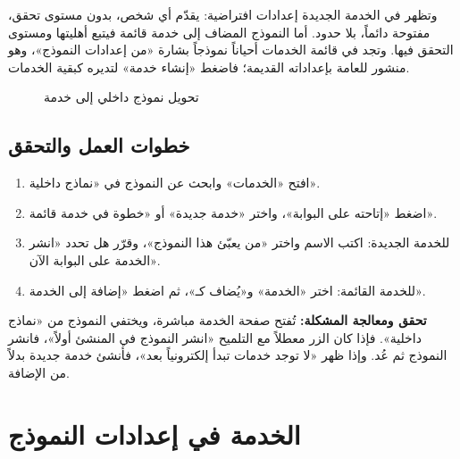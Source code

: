 وتظهر في الخدمة الجديدة إعدادات افتراضية: يقدّم أي شخص، بدون مستوى تحقق، مفتوحة دائماً، بلا حدود. أما النموذج المضاف إلى خدمة قائمة فيتبع أهليتها ومستوى التحقق فيها. وتجد في قائمة الخدمات أحياناً نموذجاً بشارة «من إعدادات النموذج»، وهو منشور للعامة بإعداداته القديمة؛ فاضغط «إنشاء خدمة» لتديره كبقية الخدمات.

\begin{figure}[H]
\centering
{}
\rclegend
\caption{تحويل نموذج داخلي إلى خدمة}
\label{fig:builder-services-publish-flow}
\end{figure}

\subsection{خطوات العمل والتحقق}
\begin{enumerate}
\item افتح «الخدمات» وابحث عن النموذج في «نماذج داخلية».
\item اضغط «إتاحته على البوابة»، واختر «خدمة جديدة» أو «خطوة في خدمة قائمة».
\item للخدمة الجديدة: اكتب الاسم واختر «من يعبّئ هذا النموذج»، وقرّر هل تحدد «انشر الخدمة على البوابة الآن».
\item للخدمة القائمة: اختر «الخدمة» و«يُضاف كـ»، ثم اضغط «إضافة إلى الخدمة».
\end{enumerate}

\textbf{تحقق ومعالجة المشكلة:} تُفتح صفحة الخدمة مباشرة، ويختفي النموذج من «نماذج داخلية». فإذا كان الزر معطلاً مع التلميح «انشر النموذج في المنشئ أولاً»، فانشر النموذج ثم عُد. وإذا ظهر «لا توجد خدمات تبدأ إلكترونياً بعد»، فأنشئ خدمة جديدة بدلاً من الإضافة.

\clearpage
\section{الخدمة في إعدادات النموذج}
\label{sec:builder-feature-services-form-settings}

